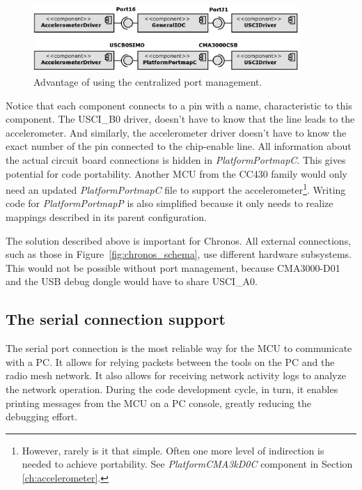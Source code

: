 \begin{figure}[h]
  \centering
  \includegraphics[width=0.9\textwidth]{diagrams/portmap_clairty.eps}
  \caption{Advantage of using the centralized port management.}
  \label{fig:}
\end{figure}
Notice that each component connects to a pin with a name, characteristic to this component. The USCI\_B0 driver, doesn't have to know that the line leads to the accelerometer. And similarly, the accelerometer driver doesn't have to know the exact number of the pin connected to the chip-enable line. All information about the actual circuit board connections is hidden in \emph{PlatformPortmapC}. This gives potential for code portability. Another MCU from the CC430 family would only need an updated \emph{PlatformPortmapC} file to support the accelerometer\footnote{However, rarely is it that simple. Often one more level of indirection is needed to achieve portability. See \emph{PlatformCMA3kD0C} component in Section \ref{ch:accelerometer}.}. Writing code for \emph{PlatformPortmapP} is also simplified because it only needs to realize mappings described in its parent configuration.

The solution described above is important for Chronos. All external connections, such as those in Figure~\ref{fig:chronos_schema}, use different hardware subsystems. This would not be possible without port management, because CMA3000-D01 and the USB debug dongle would have to share USCI\_A0.

\subsection{The serial connection support}


The serial port connection is the most reliable way for the MCU to communicate with a PC. It allows for relying packets between the tools on the PC and the radio mesh network. It also allows for receiving network activity logs to analyze the network operation. During the code development cycle, in turn, it enables printing messages from the MCU on a PC console, greatly reducing the debugging effort.

